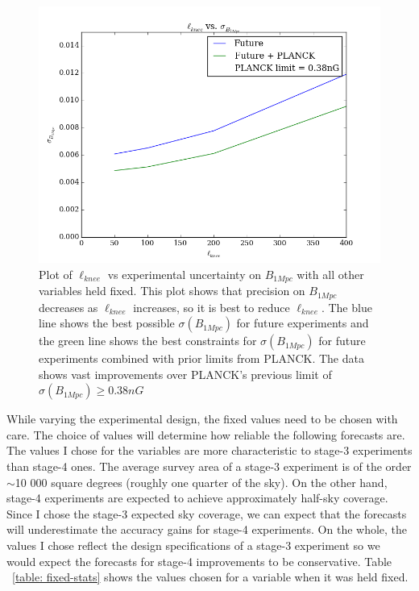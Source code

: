 \begin{figure}[h]
\centering
\includegraphics[scale=0.8]{images/knee.png}
\caption{Plot of $\ell_{knee}$ vs experimental uncertainty on $B_{1Mpc}$ with all other variables held fixed. This plot shows that precision on $B_{1Mpc}$ decreases as $\ell_{knee}$ increases, so it is best to reduce $\ell_{knee}$. The blue line shows the best possible $\sigma(B_{1Mpc})$ for future experiments and the green line shows the best constraints for $\sigma(B_{1Mpc})$ for future experiments combined with prior limits from PLANCK. The data shows vast improvements over PLANCK's previous limit of $\sigma(B_{1Mpc}) \geq 0.38nG$}
\label{fig:knee}
\end{figure}
\pagebreak

While varying the experimental design, the fixed values need to be chosen with care. The choice of values will determine how reliable the following forecasts are. The values I chose for the variables are more characteristic to stage-3 experiments than stage-4 ones. The average survey area of a stage-3 experiment is of the order $\sim$10 000 square degrees (roughly one quarter of the sky). On the other hand, stage-4 experiments are expected to achieve approximately half-sky coverage. Since I chose the stage-3 expected sky coverage, we can expect that the forecasts will underestimate the accuracy gains for stage-4 experiments. On the whole, the values I chose reflect the design specifications of a stage-3 experiment so we would expect the forecasts for stage-4 improvements to be conservative. Table ~\ref{table: fixed-stats} shows the values chosen for a variable when it was held fixed.

